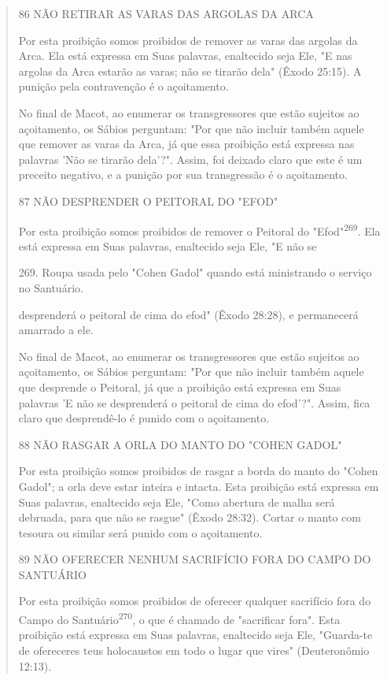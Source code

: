 \begin{quote}
86 NÃO RETIRAR AS VARAS DAS ARGOLAS DA ARCA

Por esta proibição somos proibidos de remover as varas das argolas da
Arca. Ela está expressa em Suas palavras, enaltecido seja Ele, "E nas
argolas da Arca estarão as varas; não se tirarão dela" (Êxodo 25:15). A
punição pela con­travenção é o açoitamento.

No final de Macot, ao enumerar os transgressores que estão sujeitos ao
açoitamento, os Sábios perguntam: "Por que não incluir também aquele que
remover as varas da Arca, já que essa proibição está expressa nas
palavras 'Não se tirarão dela'?". Assim, foi deixado claro que este é um
preceito negativo, e a punição por sua transgressão é o açoitamento.

87 NÃO DESPRENDER O PEITORAL DO "EFOD"

Por esta proibição somos proibidos de remover o Peitoral do
"Efod"\textsuperscript{269}. Ela está expressa em Suas palavras,
enaltecido seja Ele, "E não se

269. Roupa usada pelo "Cohen Gadol" quando está ministrando o serviço no
Santuário.

desprenderá o peitoral de cima do efod" (Êxodo 28:28), e permanecerá
amar­rado a ele.

No final de Macot, ao enumerar os transgressores que estão sujeitos ao
açoitamento, os Sábios perguntam: "Por que não incluir também aquele que
desprende o Peitoral, já que a proibição está expressa em Suas palavras
'E não se desprenderá o peitoral de cima do efod'?". Assim, fica claro
que desprendê-lo é punido com o açoitamento.

88 NÃO RASGAR A ORLA DO MANTO DO "COHEN GADOL"

Por esta proibição somos proibidos de rasgar a borda do manto do "Cohen
Gadol"; a orla deve estar inteira e intacta. Esta proibição está
expressa em Suas palavras, enaltecido seja Ele, "Como abertura de malha
será debruada, para que não se rasgue" (Êxodo 28:32). Cortar o manto com
tesoura ou similar será punido com o açoitamento.

89 NÃO OFERECER NENHUM SACRIFÍCIO FORA DO CAMPO DO SANTUÁRIO

Por esta proibição somos proibidos de oferecer qualquer sacrifício fora
do Campo do Santuário\textsuperscript{270}, o que é chamado de
"sacrificar fora". Esta proibição está expressa em Suas palavras,
enaltecido seja Ele, "Guarda-te de ofe­receres teus holocaustos em todo
o lugar que vires" (Deuteronômio 12:13).


\end{quote}
